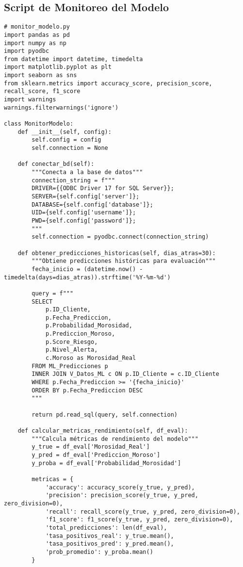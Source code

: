 \subsection{Script de Monitoreo del Modelo}

\begin{verbatim}
# monitor_modelo.py
import pandas as pd
import numpy as np
import pyodbc
from datetime import datetime, timedelta
import matplotlib.pyplot as plt
import seaborn as sns
from sklearn.metrics import accuracy_score, precision_score, recall_score, f1_score
import warnings
warnings.filterwarnings('ignore')

class MonitorModelo:
    def __init__(self, config):
        self.config = config
        self.connection = None
        
    def conectar_bd(self):
        """Conecta a la base de datos"""
        connection_string = f"""
        DRIVER={{ODBC Driver 17 for SQL Server}};
        SERVER={self.config['server']};
        DATABASE={self.config['database']};
        UID={self.config['username']};
        PWD={self.config['password']};
        """
        self.connection = pyodbc.connect(connection_string)
        
    def obtener_predicciones_historicas(self, dias_atras=30):
        """Obtiene predicciones históricas para evaluación"""
        fecha_inicio = (datetime.now() - timedelta(days=dias_atras)).strftime('%Y-%m-%d')
        
        query = f"""
        SELECT 
            p.ID_Cliente,
            p.Fecha_Prediccion,
            p.Probabilidad_Morosidad,
            p.Prediccion_Moroso,
            p.Score_Riesgo,
            p.Nivel_Alerta,
            c.Moroso as Morosidad_Real
        FROM ML_Predicciones p
        INNER JOIN V_Datos_ML c ON p.ID_Cliente = c.ID_Cliente
        WHERE p.Fecha_Prediccion >= '{fecha_inicio}'
        ORDER BY p.Fecha_Prediccion DESC
        """
        
        return pd.read_sql(query, self.connection)
    
    def calcular_metricas_rendimiento(self, df_eval):
        """Calcula métricas de rendimiento del modelo"""
        y_true = df_eval['Morosidad_Real']
        y_pred = df_eval['Prediccion_Moroso']
        y_proba = df_eval['Probabilidad_Morosidad']
        
        metricas = {
            'accuracy': accuracy_score(y_true, y_pred),
            'precision': precision_score(y_true, y_pred, zero_division=0),
            'recall': recall_score(y_true, y_pred, zero_division=0),
            'f1_score': f1_score(y_true, y_pred, zero_division=0),
            'total_predicciones': len(df_eval),
            'tasa_positivos_real': y_true.mean(),
            'tasa_positivos_pred': y_pred.mean(),
            'prob_promedio': y_proba.mean()
        }
        

\end{verbatim}
